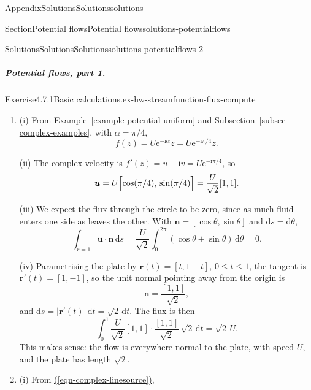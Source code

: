 \documentclass[oneside,10pt,]{book}
\newcommand{\xreffont}{\relax}
\numberwithin{equation}{section}
\newcommand{\e}{\mathrm{e}}
\newcommand{\im}{\mathrm{i}}
\newcommand{\de}{\mathrm{d}}
\newcommand{\bn}{\boldsymbol{n}}
\newcommand{\bu}{\boldsymbol{u}}
\newcommand{\br}{\boldsymbol{r}}
\begin{document}
\begin{appendixptx}{Appendix}{Solutions}{}{Solutions}{}{}{solutions}
\begin{sectionptx}{Section}{Potential flows}{}{Potential flows}{}{}{solutions-potentialflows}
\begin{solutions-subsection-numberless}{Solutions}{Solutions}{}{Solutions}{}{}{solutions-potentialflows-2}
\subparagraph[{Potential flows, part 1}]{Potential flows, part 1.}
\begin{exercisegroup}
\begin{divisionsolutioneg}{Exercise}{4.7.1}{Basic calculations.}{ex-hw-streamfunction-flux-compute}%
\begin{enumerate}[font=\bfseries,label=(\alph*),ref=\alph*]%
\item[(a)]\noindent\hypertarget{ex-hw-streamfunction-flux-compute-3-3-main}{}(i) From \hyperref[example-potential-uniform]{Example~{\xreffont\ref{example-potential-uniform}}} and \hyperref[subsec-complex-examples]{Subsection~{\xreffont\ref{subsec-complex-examples}}}, with \(\alpha = \pi/4\),%
\begin{equation*}
f(z) = U\e^{-\im\alpha}z = U\e^{-\im \pi/4}z.
\end{equation*}
%
\par
(ii) The complex velocity is \(f'(z) = u - \im v = U\e^{-\im \pi/4}\), so%
\begin{equation*}
\bu = U \Bigl[ \cos(\pi/4), \, \sin(\pi/4) \Bigr] = \frac{U}{\sqrt{2}} [1, 1].
\end{equation*}
%
\par
(iii) We expect the flux through the circle to be zero, since as much fluid enters one side as leaves the other. With \(\bn = [\cos\theta, \sin\theta]\) and \(\de{s} = \de\theta\),%
\begin{equation*}
\int_{r = 1} \bu \cdot \bn \, \de{s} = \frac{U}{\sqrt{2}} \int_0^{2\pi} (\cos\theta + \sin\theta) \, \de{\theta} = 0.
\end{equation*}
%
\par
(iv) Parametrising the plate by \(\br(t) = [t, 1 - t]\), \(0 \leq t \leq 1\), the tangent is \(\br'(t) = [1, -1]\), so the unit normal pointing away from the origin is%
\begin{equation*}
\bn = \frac{[1, 1]}{\sqrt{2}},
\end{equation*}
and \(\de{s} = |\br'(t)| \, \de{t} = \sqrt{2} \, \de{t}\). The flux is then%
\begin{equation*}
\int_0^1 \frac{U}{\sqrt{2}} [1, 1] \cdot \frac{[1, 1]}{\sqrt{2}} \, \sqrt{2} \, \de{t} = \sqrt{2}\,U.
\end{equation*}
This makes sense: the flow is everywhere normal to the plate, with speed \(U\), and the plate has length \(\sqrt{2}\).%
\item[(b)]\noindent\hypertarget{ex-hw-streamfunction-flux-compute-4-3-main}{}(i) From \hyperref[eqn-complex-linesource]{({\xreffont\ref{eqn-complex-linesource}})},%

\end{enumerate}
\end{divisionsolutioneg}
\end{exercisegroup}
\end{solutions-subsection-numberless}
\end{sectionptx}
\end{appendixptx}
\end{document}
